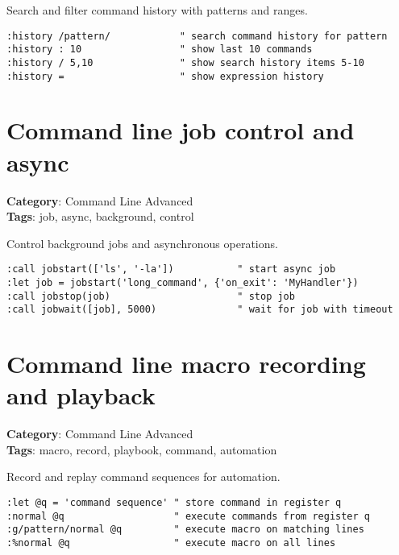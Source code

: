 {{{Search and filter command history with patterns and ranges.

\begin{Exa*}{}
\begin{Verbatim}[fontsize=\footnotesize, breaklines, breakanywhere]
:history /pattern/            " search command history for pattern
:history : 10                 " show last 10 commands
:history / 5,10               " show search history items 5-10
:history =                    " show expression history
\end{Verbatim}
\end{Exa*}

\section{Command line job control and async}

\textbf{Category}: Command Line Advanced\\ \textbf{Tags}: job, async, background, control
\vspace{0.5cm}

Control background jobs and asynchronous operations.

\begin{Exa*}{}
\begin{Verbatim}[fontsize=\footnotesize, breaklines, breakanywhere]
:call jobstart(['ls', '-la'])           " start async job
:let job = jobstart('long_command', {'on_exit': 'MyHandler'})
:call jobstop(job)                      " stop job
:call jobwait([job], 5000)              " wait for job with timeout
\end{Verbatim}
\end{Exa*}

\section{Command line macro recording and playback}

\textbf{Category}: Command Line Advanced\\ \textbf{Tags}: macro, record, playbook, command, automation
\vspace{0.5cm}

Record and replay command sequences for automation.

\begin{Exa*}{}
\begin{Verbatim}[fontsize=\footnotesize, breaklines, breakanywhere]
:let @q = 'command sequence' " store command in register q
:normal @q                   " execute commands from register q
:g/pattern/normal @q         " execute macro on matching lines
:%normal @q                  " execute macro on all lines
\end{Verbatim}
\end{Exa*}

}}}
